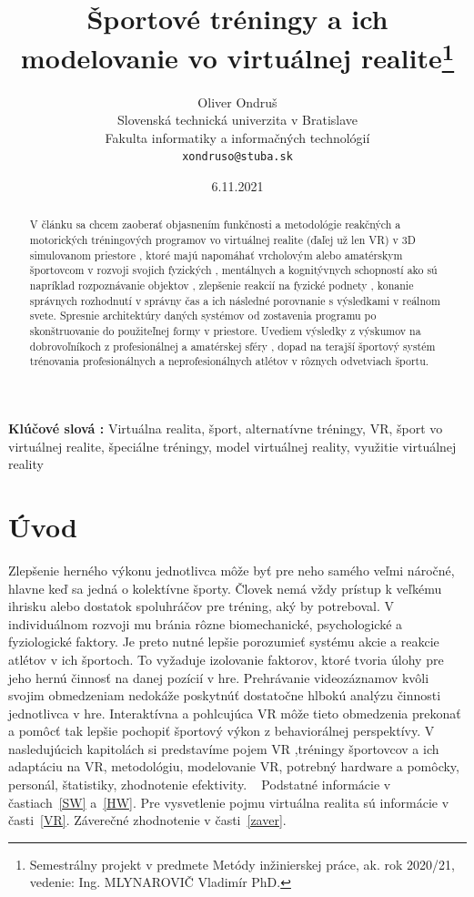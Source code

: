 \documentclass[10pt,twoside,slovak,a4paper]{article}										%
\title{Športové tréningy a ich modelovanie vo virtuálnej realite\thanks{Semestrálny projekt v predmete Metódy inžinierskej práce, ak. rok 2020/21, vedenie: Ing. MLYNAROVIČ Vladimír  PhD.}}
\author{Oliver Ondruš\\[2pt]
	{\small Slovenská technická univerzita v Bratislave}\\
	{\small Fakulta informatiky a informačných technológií}\\
	{\small \texttt{xondruso@stuba.sk}}
	}
\date{\small 6.11.2021}
\begin{document}
\maketitle

\begin{abstract}
V článku sa chcem zaoberať objasnením funkčnosti a metodológie reakčných a motorických tréningových programov vo virtuálnej realite (ďaľej už len VR) v 3D simulovanom priestore , ktoré majú napomáhať vrcholovým alebo amatérskym športovcom v rozvoji svojich fyzických , mentálnych a kognitývnych schopností ako sú napríklad rozpoznávanie objektov , zlepšenie reakcií na fyzické podnety , konanie správnych rozhodnutí v správny čas a ich následné porovnanie s výsledkami v reálnom svete. Spresnie architektúry daných systémov od zostavenia programu po skonštruovanie do použiteľnej formy v priestore. Uvediem výsledky z výskumov na dobrovoľníkoch z profesionálnej a amatérskej sféry , dopad na terajší športový systém trénovania profesionálnych a neprofesionálnych atlétov v rôznych odvetviach športu.
\end{abstract}
\textbf{Klúčové slová :}
Virtuálna realita, šport, alternatívne tréningy, VR, šport vo virtuálnej realite, špeciálne tréningy, model virtuálnej reality, využitie virtuálnej reality

\section{Úvod}
Zlepšenie herného výkonu jednotlivca môže byť pre neho samého veľmi náročné, hlavne keď sa jedná o kolektívne športy. Človek nemá vždy prístup k veľkému ihrisku alebo dostatok spoluhráčov pre tréning, aký by potreboval. V individuálnom rozvoji mu bránia rôzne biomechanické, psychologické a fyziologické faktory. Je preto nutné lepšie porozumieť systému akcie a reakcie atlétov v ich športoch. To vyžaduje izolovanie faktorov, ktoré tvoria úlohy pre jeho hernú činnosť na danej pozícií v hre. Prehrávanie videozáznamov kvôli svojim obmedzeniam nedokáže poskytnúť dostatočne hlbokú analýzu činnosti jednotlivca v hre. Interaktívna a pohlcujúca VR môže tieto obmedzenia prekonať a pomôcť tak lepšie pochopiť športový výkon z behaviorálnej perspektívy. V nasledujúcich kapitolách si predstavíme pojem VR ,tréningy športovcov a ich adaptáciu na VR, metodológiu, modelovanie VR, potrebný hardware a pomôcky, personál, štatistiky, zhodnotenie efektivity. ~\cite{Hlavny:zdroj}
Podstatné informácie v častiach~\ref{SW} a~\ref{HW}. Pre vysvetlenie pojmu virtuálna realita sú informácie v časti~\ref{VR}. 
Záverečné zhodnotenie v časti~\ref{zaver}.
  
\end{document}
